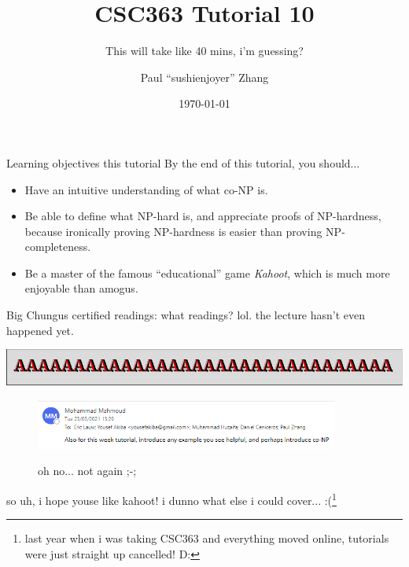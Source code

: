 \documentclass{beamer}
\title{CSC363 Tutorial 10}
\subtitle{This will take like 40 mins, i'm guessing?}
\date{\today}
\author{Paul ``sushi{\textunderscore}enjoyer'' Zhang}
\institute{University of Chungus in Japanese dub}
\begin{document}
\maketitle

\begin{frame}{Learning objectives this tutorial}
By the end of this tutorial, you should...
\begin{itemize}
\item Have an intuitive understanding of what co-NP is.
\item Be able to define what NP-hard is, and appreciate proofs of NP-hardness, because ironically proving NP-hardness is easier than proving NP-completeness.
\item Be a master of the famous ``educational'' game \textit{Kahoot}, which is much more enjoyable than amogus. 
\end{itemize}

Big Chungus certified readings: what readings? lol. the lecture hasn't even happened yet.
\end{frame}

\begin{frame}{\includegraphics{img/a.png}}
\begin{figure}[h]
\centering
\includegraphics[width=10cm]{img/helpme.png}

oh no... not again ;-;
\end{figure}

so uh, i hope youse like kahoot! i dunno what else i could cover... :(\footnote{last year when i was taking CSC363 and everything moved online, tutorials were just straight up cancelled! D:}
\end{frame}
\end{document}
